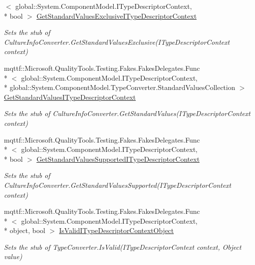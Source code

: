 \begin{DoxyCompactItemize}
$<$ global\-::\-System.\-Component\-Model.\-I\-Type\-Descriptor\-Context, \\*
bool $>$ \hyperlink{class_system_1_1_component_model_1_1_fakes_1_1_stub_culture_info_converter_af0c2c3f09f63b77cfe161c4d6814253e}{Get\-Standard\-Values\-Exclusive\-I\-Type\-Descriptor\-Context}
\begin{DoxyCompactList}\small\item\em Sets the stub of Culture\-Info\-Converter.\-Get\-Standard\-Values\-Exclusive(\-I\-Type\-Descriptor\-Context context)\end{DoxyCompactList}\item 
mqttf\-::\-Microsoft.\-Quality\-Tools.\-Testing.\-Fakes.\-Fakes\-Delegates.\-Func\\*
$<$ global\-::\-System.\-Component\-Model.\-I\-Type\-Descriptor\-Context, \\*
global\-::\-System.\-Component\-Model.\-Type\-Converter.\-Standard\-Values\-Collection $>$ \hyperlink{class_system_1_1_component_model_1_1_fakes_1_1_stub_culture_info_converter_af58581959e9ecc990a5072544da12d45}{Get\-Standard\-Values\-I\-Type\-Descriptor\-Context}
\begin{DoxyCompactList}\small\item\em Sets the stub of Culture\-Info\-Converter.\-Get\-Standard\-Values(\-I\-Type\-Descriptor\-Context context)\end{DoxyCompactList}\item 
mqttf\-::\-Microsoft.\-Quality\-Tools.\-Testing.\-Fakes.\-Fakes\-Delegates.\-Func\\*
$<$ global\-::\-System.\-Component\-Model.\-I\-Type\-Descriptor\-Context, \\*
bool $>$ \hyperlink{class_system_1_1_component_model_1_1_fakes_1_1_stub_culture_info_converter_a067c297471a53314a531276698abf410}{Get\-Standard\-Values\-Supported\-I\-Type\-Descriptor\-Context}
\begin{DoxyCompactList}\small\item\em Sets the stub of Culture\-Info\-Converter.\-Get\-Standard\-Values\-Supported(\-I\-Type\-Descriptor\-Context context)\end{DoxyCompactList}\item 
mqttf\-::\-Microsoft.\-Quality\-Tools.\-Testing.\-Fakes.\-Fakes\-Delegates.\-Func\\*
$<$ global\-::\-System.\-Component\-Model.\-I\-Type\-Descriptor\-Context, \\*
object, bool $>$ \hyperlink{class_system_1_1_component_model_1_1_fakes_1_1_stub_culture_info_converter_aac4712e1bdec432d586a5888700b3d3b}{Is\-Valid\-I\-Type\-Descriptor\-Context\-Object}
\begin{DoxyCompactList}\small\item\em Sets the stub of Type\-Converter.\-Is\-Valid(\-I\-Type\-Descriptor\-Context context, Object value)\end{DoxyCompactList}\end{DoxyCompactItemize}
